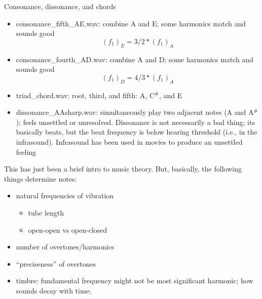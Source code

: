 Consonance, dissonance, and chords
\begin{itemize}
\item consonance\_fifth\_AE.wav: combine A and E; some harmonics match and sounds good 
$$\left(f_1\right)_E=3/2*\left(f_1\right)_A$$
\item consonance\_fourth\_AD.wav: combine A and D; some harmonics match and sounds good 
  $$\left(f_1\right)_D=4/3*\left(f_1\right)_A$$
\item triad\_chord.wav: root, third, and fifth: A, C$^\#$, and E
\item dissonance\_AAsharp.wav: simultaneously play two adjacent notes (A and A$^\#$); feels unsettled or unresolved. Dissonance is not necessarily a bad thing; its basically beats, but the beat frequency is below hearing threshold (i.e., in the infrasound). Infrasound has been used in movies to produce an unsettled feeling
\end{itemize}
  
This has just been a brief intro to music theory. But, basically, the following things determine notes:
\begin{itemize}
\item natural frequencies of vibration
  \begin{itemize}
  \item tube length
  \item open-open vs open-closed
  \end{itemize}
\item number of overtones/harmonics
\item ``preciseness'' of overtones
\item timbre: fundamental frequency might not be most significant harmonic; how sounds decay with time;
\end{itemize}
